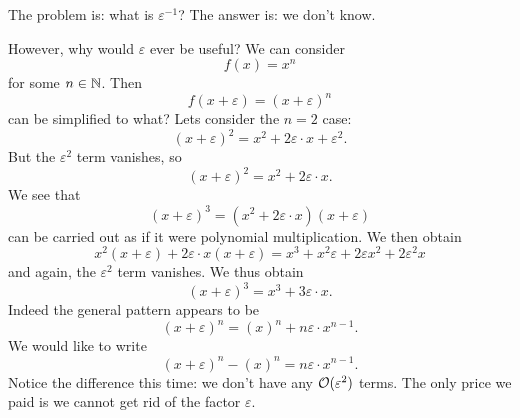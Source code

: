 The problem is: what is $\varepsilon^{-1}$? The answer is: we
don't know.

However, why would $\varepsilon$ ever be useful? We can consider
\begin{equation}
f(x)=x^{n}
\end{equation}
for some $n\in\mathbb{N}$. Then
\begin{equation}
f(x+\varepsilon)=(x+\varepsilon)^{n}
\end{equation}
can be simplified to what? Lets consider the $n=2$ case:
\begin{equation}
(x+\varepsilon)^{2}=x^{2}+2\varepsilon\cdot x+\varepsilon^{2}.
\end{equation}
But the $\varepsilon^{2}$ term vanishes, so
\begin{equation}
(x+\varepsilon)^{2}=x^{2}+2\varepsilon\cdot x.
\end{equation}
We see that
\begin{equation}
(x+\varepsilon)^{3}=(x^{2}+2\varepsilon\cdot x)(x+\varepsilon)
\end{equation}
can be carried out as if it were polynomial multiplication. We
then obtain
\begin{equation}
x^{2}(x+\varepsilon)+2\varepsilon\cdot x(x+\varepsilon)=
x^{3}+x^{2}\varepsilon+2\varepsilon x^{2}+2\varepsilon^{2}x
\end{equation}
and again, the $\varepsilon^{2}$ term vanishes. We thus obtain
\begin{equation}
(x+\varepsilon)^{3} = x^{3}+3\varepsilon\cdot x.
\end{equation}
Indeed  the general pattern appears to be
\begin{equation}
(x+\varepsilon)^{n}=(x)^{n}+n\varepsilon\cdot x^{n-1}.
\end{equation}
We would like to write
\begin{equation}
(x+\varepsilon)^{n}-(x)^{n}=n\varepsilon\cdot x^{n-1}.
\end{equation}
Notice the difference this time: we don't have any
$\mathcal{O}(\varepsilon^{2})$ terms. The only price we paid is we
cannot get rid of the factor $\varepsilon$.

